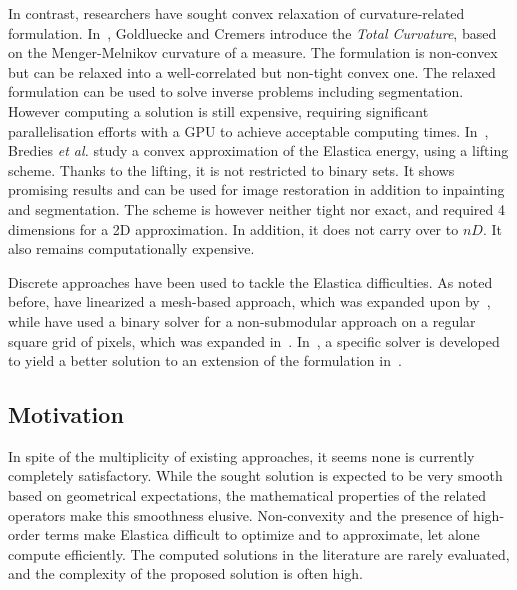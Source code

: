 \documentclass[smallextended]{svjour3}       %
\newcommand{\todo}[1]{{\textcolor{blue}{#1}}}
\begin{document}
In contrast, researchers have sought convex relaxation of curvature-related
formulation. In~\cite{goldluecke11totalcurvature}, Goldluecke and Cremers introduce the {\em Total Curvature}, based
on the Menger-Melnikov curvature of a measure. The formulation is non-convex but can be relaxed into a well-correlated
but non-tight convex one. The relaxed formulation can be used to solve inverse problems including segmentation. However computing a solution is still expensive, requiring significant parallelisation efforts with a GPU to achieve
  acceptable computing times. In~\cite{bredies15convex}, Bredies {\em et al.} study a convex approximation of the
  Elastica energy, using a lifting scheme. Thanks to the lifting, it is not restricted to binary sets. It shows
  promising results and can be used for image restoration in addition to inpainting and segmentation. The scheme is
  however neither tight nor exact, and required 4 dimensions for a 2D approximation. In addition, it does not carry over
to $nD$. It also remains computationally expensive.


Discrete approaches have been used to tackle the Elastica
difficulties. As noted before, \cite{schoenemann09linear} have
linearized a mesh-based approach, which was expanded upon
by~\cite{strandmark11globalframework}, while \cite{zehiry10fast} have
used a binary solver for a non-submodular approach on a regular square
grid of pixels, which was expanded
in~\cite{el2016contrast}. In~\cite{nieuwenhuis14efficient}, a
specific solver is developed to yield a better solution to an
extension of the formulation in~\cite{zehiry10fast}.


\subsection{Motivation}
In spite of the multiplicity of existing approaches, it seems none is
currently completely satisfactory. While the sought solution is
expected to be very smooth based on geometrical expectations, the
mathematical properties of the related operators make this smoothness
elusive. Non-convexity and the presence of high-order terms make
Elastica difficult to optimize and to approximate, let alone compute
efficiently. The computed solutions in the literature are rarely
evaluated, and the complexity of the proposed solution is often high.

\end{document}
